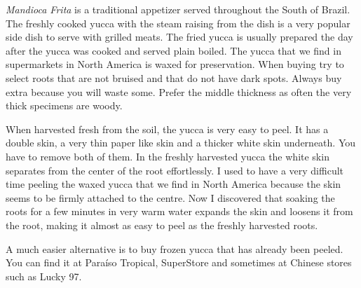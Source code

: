 \documentclass[11pt,letterpaper]{article}
\begin{document}


{\em Mandioca Frita} is a traditional appetizer served throughout the
South of Brazil. The freshly cooked yucca with the steam raising from
the dish is a very popular side dish to serve with grilled meats. The
fried yucca is usually prepared the day after the yucca was cooked and
served plain boiled. The yucca that we find in supermarkets in North
America is waxed for preservation. When buying try to select roots
that are not bruised and that do not have dark spots. Always buy extra
because you will waste some. Prefer the middle thickness as often the
very thick specimens are woody.

When harvested fresh from the soil, the yucca is very easy to peel. It
has a double skin, a very thin paper like skin and a thicker white
skin underneath. You have to remove both of them. In the freshly
harvested yucca the white skin separates from the center of the root
effortlessly. I used to have a very difficult time peeling the waxed
yucca that we find in North America because the skin seems to be
firmly attached to the centre. Now I discovered that soaking the roots
for a few minutes in very warm water expands the skin and loosens it
from the root, making it almost as easy to peel as the freshly
harvested roots.

A much easier alternative is to buy frozen yucca that has already been peeled. You can find it at Para\'iso Tropical, SuperStore and sometimes at Chinese stores such as Lucky 97.
\end{document}
